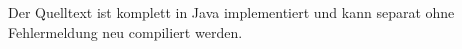 Der Quelltext ist komplett in Java implementiert und kann
separat ohne Fehlermeldung neu compiliert werden.
